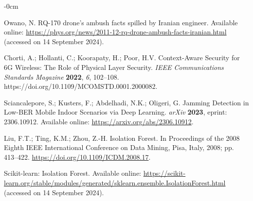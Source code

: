 \documentclass[futureinternet,article,submit,pdftex,moreauthors]{Definitions/mdpi}
\begin{document}
\begin{adjustwidth}{-\extralength}{0cm}
\begin{thebibliography}{999}
Owano, N. RQ-170 drone's ambush facts spilled by Iranian engineer. Available online: \url{https://phys.org/news/2011-12-rq-drone-ambush-facts-iranian.html} (accessed on 14 September 2024).

Chorti, A.; Hollanti, C.; Koorapaty, H.; Poor, H.V. Context-Aware Security for 6G Wireless: The Role of Physical Layer Security. {\em IEEE Communications Standards Magazine} {\bf 2022}, {\em 6}, 102--108. https://doi.org/10.1109/MCOMSTD.0001.2000082.

Sciancalepore, S.; Kusters, F.; Abdelhadi, N.K.; Oligeri, G. Jamming Detection in Low-BER Mobile Indoor Scenarios via Deep Learning. {\em arXiv} {\bf 2023}, eprint: 2306.10912. Available online: \url{https://arxiv.org/abs/2306.10912}.

Liu, F.T.; Ting, K.M.; Zhou, Z.-H. Isolation Forest. In Proceedings of the 2008 Eighth IEEE International Conference on Data Mining, Pisa, Italy, 2008; pp. 413--422. \url{https://doi.org/10.1109/ICDM.2008.17}.

Scikit-learn: Isolation Forest. Available online: \url{https://scikit-learn.org/stable/modules/generated/sklearn.ensemble.IsolationForest.html} (accessed on 14 September 2024).

\end{thebibliography}

%



\PublishersNote{}
\end{adjustwidth}
\end{document}
